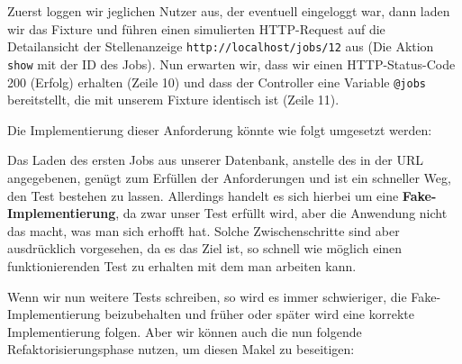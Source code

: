 \tddred
Zuerst loggen wir jeglichen Nutzer aus, der eventuell eingeloggt war, dann laden wir das Fixture und führen einen simulierten HTTP-Request auf die Detailansicht der Stellenanzeige \texttt{http://localhost/jobs/12} aus (Die Aktion \texttt{show} mit der ID des Jobs).
Nun erwarten wir, dass wir einen HTTP-Status-Code 200 (Erfolg) erhalten (Zeile 10) und dass der Controller eine Variable \texttt{@jobs} bereitstellt, die mit unserem Fixture identisch ist (Zeile 11).

Die Implementierung dieser Anforderung könnte wie folgt umgesetzt werden:
%
%
\begin{ruby}[label=app/controllers/jobs\_controller.rb]
   
   
      
\end{ruby}

\tddgreen
Das Laden des ersten Jobs aus unserer Datenbank, anstelle des in der URL angegebenen, genügt zum Erfüllen der Anforderungen und ist ein schneller Weg, den Test bestehen zu lassen. Allerdings handelt es sich hierbei um eine \textbf{Fake-Implementierung}, da zwar unser Test erfüllt wird, aber die Anwendung nicht das macht, was man sich erhofft hat. Solche Zwischenschritte sind aber ausdrücklich vorgesehen, da es das Ziel ist, so schnell wie möglich einen funktionierenden Test zu erhalten mit dem man arbeiten kann.

Wenn wir nun weitere Tests schreiben, so wird es immer schwieriger, die Fake\hyp{}Implementierung beizubehalten und früher oder später wird eine korrekte Implementierung folgen.
Aber wir können auch die nun folgende Refaktorisierungsphase nutzen, um diesen Makel zu beseitigen:
\tddrefactor
%
\begin{ruby}[label=app/controllers/jobs\_controller.rb]
 
    \PY{o}{[}\PY{o}{]}
\end{ruby}



